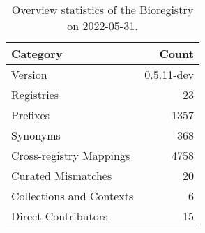 \begin{table}
\centering
\caption{Overview statistics of the Bioregistry on 2022-05-31.}
\label{tab:bioregistry-summary}
\begin{tabular}{lr}
\toprule
                Category &      Count \\
\midrule
                 Version & 0.5.11-dev \\
              Registries &         23 \\
                Prefixes &       1357 \\
                Synonyms &        368 \\
 Cross-registry Mappings &       4758 \\
      Curated Mismatches &         20 \\
Collections and Contexts &          6 \\
     Direct Contributors &         15 \\
\bottomrule
\end{tabular}
\end{table}
